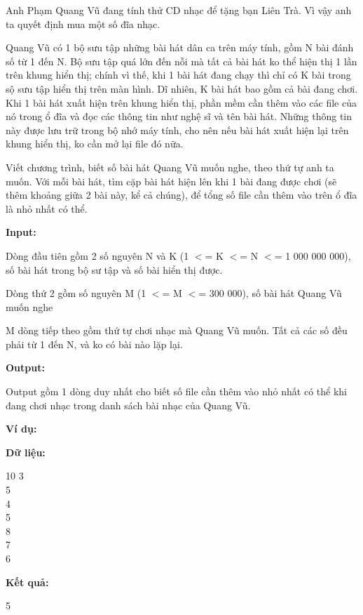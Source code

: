 



   Anh Phạm Quang Vũ đang tính thử CD nhạc để tặng bạn Liên Trà. Vì vậy anh ta quyết định mua một số đĩa nhạc.  

   Quang Vũ có 1 bộ sưu tập những bài hát dân ca trên máy tính, gồm N bài đánh số từ 1 đến N. Bộ sưu tập quá lớn đến nỗi mà tất cả bài hát ko thể hiện thị 1 lần trên khung hiển thị; chính vì thế, khi 1 bài hát đang chạy thì chỉ có K bài trong sộ sưu tập hiển thị trên màn hình. Dĩ nhiên, K bài hát bao gồm cả bài đang chơi. Khi 1 bài hát xuất hiện trên khung hiển thị, phần mềm cần thêm vào các file của nó trong ổ đĩa và đọc các thông tin như nghệ sĩ và tên bài hát. Những thông tin này được lưu trữ trong bộ nhớ máy tính, cho nên nếu bài hát xuất hiện lại trên khung hiển thị, ko cần mở lại file đó nữa.  

   Viết chương trình, biết số bài hát Quang Vũ muốn nghe, theo thứ tự anh ta muốn. Với mỗi bài hát, tìm cặp bài hát hiện lên khi 1 bài đang được chơi (sẽ thêm khoảng giữa 2 bài này, kể cả chúng), để tổng số file cần thêm vào trên ổ đĩa là nhỏ nhất có thể.  



\textbf{    Input:   }

   Dòng đầu tiên gồm 2 số nguyên N và K (1 $<$= K $<$= N $<$= 1 000 000 000), số bài hát trong bộ sư tập và số bài hiển thị được.  

   Dòng thứ 2 gồm số nguyên M (1 $<$= M $<$= 300 000), số bài hát Quang Vũ muốn nghe  

   M dòng tiếp theo gồm thứ tự chơi nhạc mà Quang Vũ muốn. Tất cả các số đều phải từ 1 đến N, và ko có bài nào lặp lại.  



\textbf{    Output:   }

   Output gồm 1 dòng duy nhất cho biết số file cần thêm vào nhỏ nhất có thể khi đang chơi nhạc trong danh sách bài nhạc của Quang Vũ.  

\textbf{    Ví dụ:   }



\textbf{    Dữ liệu:   }

   10 3   
\\   5   
\\   4   
\\   5   
\\   8   
\\   7   
\\   6  



\textbf{    Kết quả:   }

   5  





